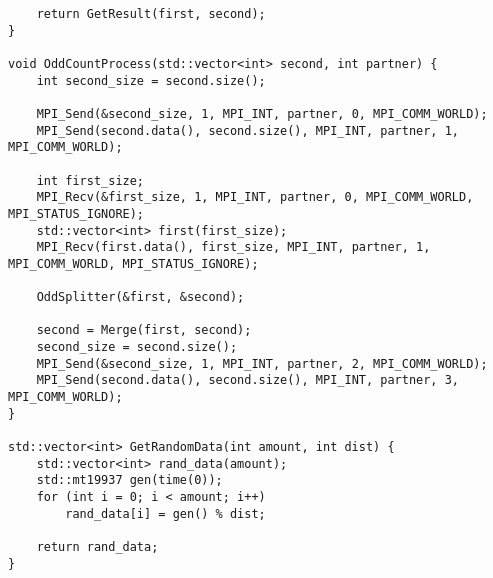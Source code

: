 \documentclass[12pt]{report}
\begin{document}
\begin{lstlisting}
    return GetResult(first, second);
}

void OddCountProcess(std::vector<int> second, int partner) {
    int second_size = second.size();

    MPI_Send(&second_size, 1, MPI_INT, partner, 0, MPI_COMM_WORLD);
    MPI_Send(second.data(), second.size(), MPI_INT, partner, 1, MPI_COMM_WORLD);

    int first_size;
    MPI_Recv(&first_size, 1, MPI_INT, partner, 0, MPI_COMM_WORLD, MPI_STATUS_IGNORE);
    std::vector<int> first(first_size);
    MPI_Recv(first.data(), first_size, MPI_INT, partner, 1, MPI_COMM_WORLD, MPI_STATUS_IGNORE);

    OddSplitter(&first, &second);

    second = Merge(first, second);
    second_size = second.size();
    MPI_Send(&second_size, 1, MPI_INT, partner, 2, MPI_COMM_WORLD);
    MPI_Send(second.data(), second.size(), MPI_INT, partner, 3, MPI_COMM_WORLD);
}

std::vector<int> GetRandomData(int amount, int dist) {
    std::vector<int> rand_data(amount);
    std::mt19937 gen(time(0));
    for (int i = 0; i < amount; i++)
        rand_data[i] = gen() % dist;

    return rand_data;
}

\end{lstlisting}
\end{document}
